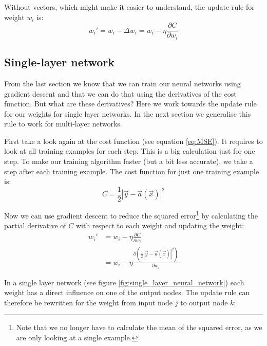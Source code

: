 Without vectors, which might make it easier to understand, the update rule for weight $w_i$ is:
\begin{equation}
w_i'= w_i - \Delta w_i = w_i - \eta \frac{\partial C}{\partial w_i}
\end{equation}

\subsection{Single-layer network}
From the last section we know that we can train our neural networks using gradient descent and that we can do that using the derivatives of the cost function. But what are these derivatives? Here we work towards the update rule for our weights for single layer networks. In the next section we generalise this rule to work for multi-layer networks.

First take a look again at the cost function (see equation \ref{eq:MSE}). It requires to look at all training examples for each step. This is a big calculation just for one step. To make our training algorithm faster (but a bit less accurate), we take a step after each training example. The cost function for just one training example is:
\begin{equation}
C = \frac{1}{2} \left | \vec{y} - \vec{a}(\vec{x}) \right |^2
\end{equation}

Now we can use gradient descent to reduce the squared error\footnote{Note that we no longer have to calculate the mean of the squared error, as we are only looking at a single example.} by calculating the partial derivative of $C$ with respect to each weight and updating the weight:
\begin{equation}
\begin{split}
w_i' & = w_i - \eta \frac{\partial C}{\partial w_i} \\
& = w_i - \eta \frac{\partial(\frac{1}{2} \left | \vec{y} - \vec{a}(\vec{x}) \right |^2)}{\partial w_i}
\end{split}
\end{equation}

In a single layer network (see figure \ref{fig:single_layer_neural_network}) each weight has a direct influence on one of the output nodes. The update rule can therefore be rewritten for the weight from input node $j$ to output node $k$:%

